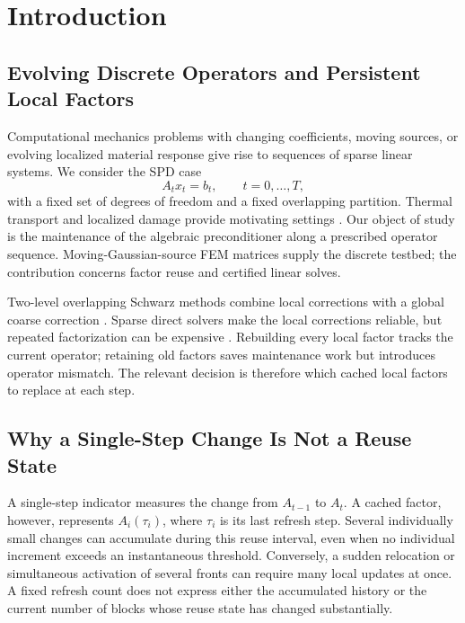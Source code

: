 \documentclass[preprint,12pt,3p]{elsarticle}
\begin{document}
\section{Introduction}
\label{sec:intro}

\subsection{Evolving Discrete Operators and Persistent Local Factors}
Computational mechanics problems with changing coefficients, moving sources,
or evolving localized material response give rise to sequences of sparse
linear systems. We consider the SPD case
\begin{equation}
A_t x_t=b_t,\qquad t=0,\ldots,T,
\label{eq:seq_linear_systems}
\end{equation}
with a fixed set of degrees of freedom and a fixed overlapping partition.
Thermal transport and localized damage provide motivating settings
\cite{michaleris2014modeling,lemaitre2005engineering}. Our object of study is
the maintenance of the algebraic preconditioner along a prescribed operator
sequence. Moving-Gaussian-source FEM matrices supply the discrete testbed;
the contribution concerns factor reuse and certified linear solves.

Two-level overlapping Schwarz methods combine local corrections with a
global coarse correction \cite{toselli2005domain,doval2008domain,smith1996domain}.
Sparse direct solvers make the local corrections reliable, but repeated
factorization can be expensive \cite{amestoy2001fully,li2005overview}.
Rebuilding every local factor tracks the current operator; retaining old
factors saves maintenance work but introduces operator mismatch. The relevant
decision is therefore which cached local factors to replace at each step.

\subsection{Why a Single-Step Change Is Not a Reuse State}
A single-step indicator measures the change from $A_{t-1}$ to $A_t$.
A cached factor, however, represents $A_i(\tau_i)$, where $\tau_i$ is its last
refresh step. Several individually small changes can accumulate during this
reuse interval, even when no individual increment exceeds an instantaneous
threshold. Conversely, a sudden relocation or simultaneous activation of
several fronts can require many local updates at once. A fixed refresh count
does not express either the accumulated history or the current number of
blocks whose reuse state has changed substantially.
\end{document}
